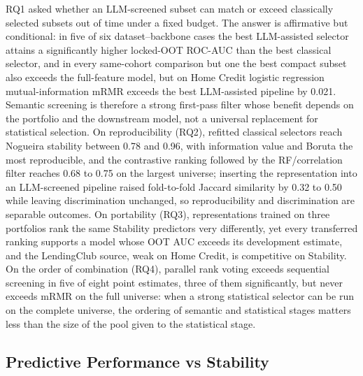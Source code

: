 \documentclass[final,5p,twocolumn]{elsarticle}
\begin{document}
RQ1 asked whether an LLM-screened subset can match or exceed classically selected subsets out of time under a fixed budget. The answer is affirmative but conditional: in five of six dataset--backbone cases the best LLM-assisted selector attains a significantly higher locked-OOT ROC-AUC than the best classical selector, and in every same-cohort comparison but one the best compact subset also exceeds the full-feature model, but on Home Credit logistic regression mutual-information mRMR exceeds the best LLM-assisted pipeline by 0.021. Semantic screening is therefore a strong first-pass filter whose benefit depends on the portfolio and the downstream model, not a universal replacement for statistical selection. On reproducibility (RQ2), refitted classical selectors reach Nogueira stability between 0.78 and 0.96, with information value and Boruta the most reproducible, and the contrastive ranking followed by the RF/correlation filter reaches 0.68 to 0.75 on the largest universe; inserting the representation into an LLM-screened pipeline raised fold-to-fold Jaccard similarity by 0.32 to 0.50 while leaving discrimination unchanged, so reproducibility and discrimination are separable outcomes. On portability (RQ3), representations trained on three portfolios rank the same Stability predictors very differently, yet every transferred ranking supports a model whose OOT AUC exceeds its development estimate, and the LendingClub source, weak on Home Credit, is competitive on Stability. On the order of combination (RQ4), parallel rank voting exceeds sequential screening in five of eight point estimates, three of them significantly, but never exceeds mRMR on the full universe: when a strong statistical selector can be run on the complete universe, the ordering of semantic and statistical stages matters less than the size of the pool given to the statistical stage.

\subsection{Predictive Performance vs Stability}
\label{subsec:performance_vs_stability}
\end{document}

